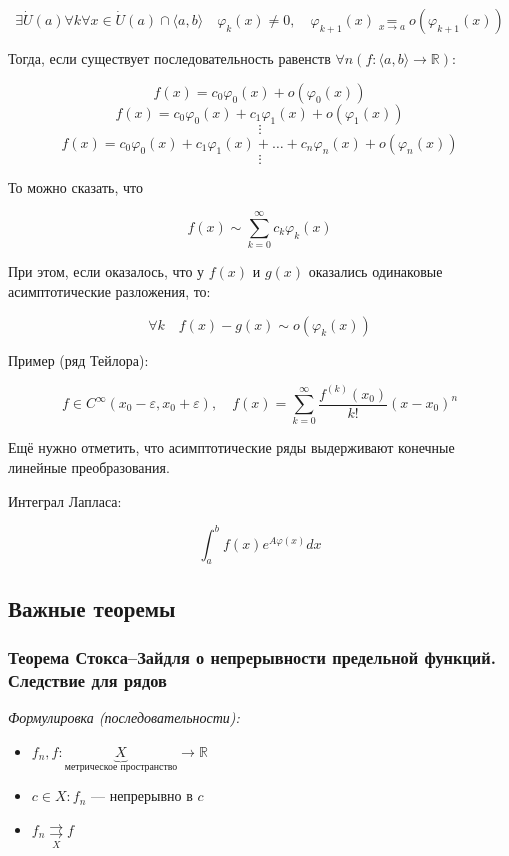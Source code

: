 \documentclass{article}
\def\rsh#1{\underset{#1}{\rightrightarrows}}
\begin{document}
\[\exists \dot{U}(a) \forall k \forall x \in \dot{U}(a) \cap \langle a, b \rangle \quad \varphi_{k}(x) \neq 0, \quad \varphi_{k + 1}(x) \underset{x \rightarrow a}{=} o(\varphi_{k + 1}(x))\]

Тогда, если существует последовательность равенств $\forall n (f: \langle a, b \rangle \rightarrow \mathbb{R})$:

\[f(x) = c_{0}\varphi_{0}(x) + o(\varphi_{0}(x))\]
\[f(x) = c_{0}\varphi_{0}(x) + c_{1}\varphi_{1}(x) + o(\varphi_{1}(x))\]
\[\vdots\]
\[f(x) = c_{0}\varphi_{0}(x) + c_{1}\varphi_{1}(x) + \ldots + c_{n}\varphi_n(x) + o(\varphi_{n}(x))\]
\[\vdots\]

То можно сказать, что 

\[f(x) \sim \sum_{k = 0}^{\infty} c_{k}\varphi_{k}(x)\]


При этом, если оказалось, что у $f(x)$ и $g(x)$ оказались одинаковые асимптотические разложения, то: 

\[\forall k \quad f(x) - g(x) \sim o(\varphi_k(x))\]

Пример (ряд Тейлора): 

\[f \in C^{\infty}(x_0 - \varepsilon, x_0 + \varepsilon), \quad f(x) = \sum_{k = 0}^{\infty} \frac{f^{(k)}(x_0)}{k!}(x - x_0)^{n}\]


Ещё нужно отметить, что асимптотические ряды выдерживают конечные линейные преобразования.

Интеграл Лапласа: 

\[\int_a^b f(x)e^{A\varphi(x)}dx\]

\newpage

\subsection{Важные теоремы}

\subsubsection{Теорема Стокса--Зайдля о непрерывности предельной функций. Следствие для рядов}

\textit{Формулировка (последовательности):}

\begin{itemize}
    \item $f_n, f: \underbrace{X}_{\text{метрическое пространство}} \rightarrow \mathbb{R}$
    \item $c \in X: f_n$ --- непрерывно в $c$  
    \item $f_n \rsh{X} f$
\end{itemize}
\end{document}
